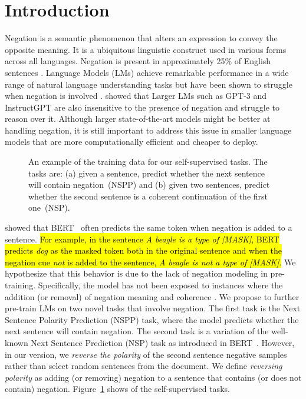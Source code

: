 \section{Introduction}
\label{sec:introduction}

Negation is a semantic phenomenon that alters an expression to convey the opposite meaning. 
It is a ubiquitous linguistic construct used in various forms across all languages.
Negation is present in approximately 25\% of English sentences \cite{hossain-etal-2020-analysis}.
Language Models (LMs) achieve remarkable performance in a wide range of natural language understanding tasks 
but have been shown to struggle when negation is involved 
\cite{ettinger-2020-bert,dobreva-keller-2021-investigating,hosseini-etal-2021-understanding,jang-etal-2022-beyond}.
\citet{truong-etal-2023-language} showed that Larger LMs 
such as GPT-3 
\cite{NEURIPS2020_1457c0d6}
and InstructGPT 
\cite{ouyang2022training} 
are also insensitive to the presence of negation and struggle to reason over it.
Although larger state-of-the-art models might be better at handling negation, 
it is still important to address this issue in smaller language models that are more computationally efficient and cheaper to deploy.

\begin{figure}
    \centering
    
    \caption{
        An example of the training data for our self-supervised tasks.
        The tasks are: (a) given a sentence, predict whether the next sentence will contain negation~(NSPP)
        and (b) given two sentences, predict whether the second sentence is a coherent continuation of the first one~(NSP).
        \label{fig:introexample}
    }
\end{figure}

\citet{kassner-schutze-2020-negated} showed that {BERT}~\cite{devlin-etal-2019-bert}
often predicts the same token when negation is added to a sentence.
\hl{
For example, in the sentence \textit{A beagle is a type of [MASK]}, 
{BERT} predicts \textit{dog} as the masked token both in
the original sentence
and 
when the negation cue \textit{not} is added to the sentence,
\textit{A beagle is {not} a type of [MASK]}.}
We hypothesize that this behavior is due to the lack of negation modeling in pre-training.
Specifically, the model has not been exposed to instances where the addition (or removal) of negation  meaning and coherence .
We propose to further pre-train LMs on two novel tasks that involve negation. 
The first task is the Next Sentence Polarity Prediction (NSPP) task, 
where  the model predicts whether the next sentence will contain negation. 
The second task is a variation of the well-known Next Sentence Prediction (NSP) task as introduced in {BERT}~\cite{devlin-etal-2019-bert}.
However, in our version, 
we \emph{reverse the polarity} of the second sentence  negative samples rather than select random sentences from the document.
We define \emph{reversing polarity} as adding (or removing) negation to a sentence that contains (or does not contain) negation.
Figure~\ref{fig:introexample} shows  of the self-supervised tasks.

